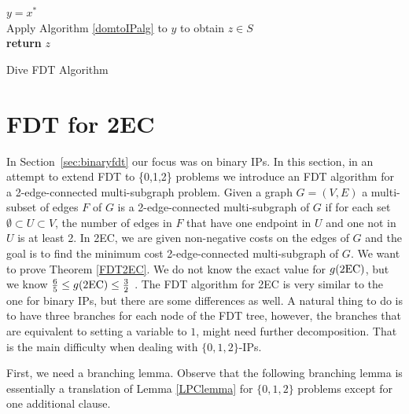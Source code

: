 	\begin{algorithm}[H]\label{FDT-dive}
		$y = x^*$\\
		Apply Algorithm \ref{domtoIPalg} to $y$ to obtain $z\in S$\\
		\textbf{return} $z$
		\caption{Dive FDT Algorithm}
	\end{algorithm}
	



\section{FDT for 2EC}\label{sec:2EC}

In Section~\ref{sec:binaryfdt} our focus was on binary IPs. In this section, in an attempt to extend FDT to \{0,1,2\} problems we introduce an FDT algorithm for a 2-edge-connected multi-subgraph problem. Given a graph $G=(V,E)$ a multi-subset of edges $F$ of $G$ is a 2-edge-connected multi-subgraph of $G$ if for each set $\emptyset\subset U \subset V$, the number of edges in $F$ that have one endpoint in $U$ and one not in $U$ is at least 2. In 2EC, we are given non-negative costs on the edges of $G$ and the goal is to find the minimum cost 2-edge-connected multi-subgraph of $G$. We want to prove Theorem \ref{FDT2EC}.
\FDTEC*
We do not know the exact value for $g(\2ec)$, but we know $\frac{6}{5} \leq g(\2ec) \leq \frac{3}{2}$ \cite{alexander2006integrality,wolsey}. The FDT algorithm for 2EC is very similar to the one for binary IPs, but there are some differences as well. A natural thing to do is to have three branches for each node of the FDT tree, however, the branches that are equivalent to setting a variable to $1$, might need further decomposition. That is the main difficulty when dealing with $\{0,1,2\}$-IPs.

First, we need a branching lemma. Observe that  the following branching lemma is essentially a translation of Lemma \ref{LPClemma} for $\{0,1,2\}$ problems except for one additional clause. 

